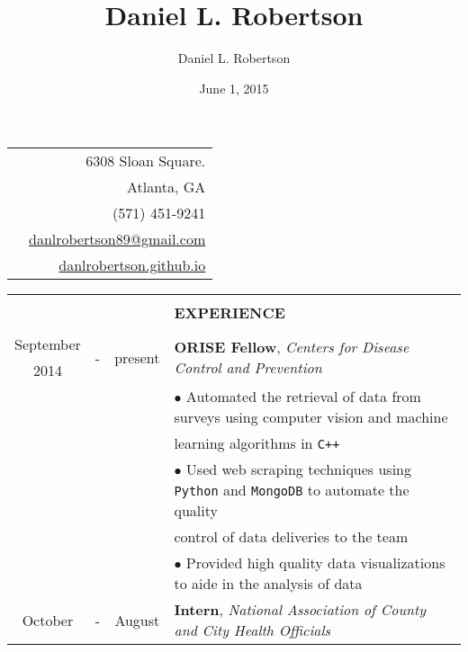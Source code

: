\documentclass[10pt]{article}
\title{Daniel L. Robertson}
\date{June 1, 2015}
\author{Daniel L. Robertson}
\begin{document}
    \normalfont
    \begin{table}[ht]
        \begin{tabular}{p{13cm}r}
            \multirow{5}{*}{\hspace*{1cm}\color{maroon}{\huge\textbf{Daniel L. Robertson}}} & 6308 Sloan Square.\\
            & Atlanta, GA\\
            & (571) 451-9241\\
            & \href{mailto:danlrobertson89@gmail.com}{danlrobertson89@gmail.com}\\
            & \href{http://danlrobertson.github.io}{danlrobertson.github.io}\\
        \end{tabular}
        \begin{tabular}{@{\hspace{0mm}}c@{\hspace{1mm}}c@{\hspace{3mm}}cl}
            & & & \color{maroon}{\rule{14cm}{0.75pt}}\\
            & & & \large{\textbf{EXPERIENCE}}\\
            & & & \color{maroon}{\rule{14cm}{0.75pt}}\\
            September & \multirow{2}{*}{-} & \multirow{2}{*}{present} & \multirow{2}{*}{\textbf{ORISE Fellow}, \textit{Centers for Disease Control and Prevention}}\\
            2014 & & &\\
            & & & $\bullet$ Automated the retrieval of data from surveys using computer vision and machine\\
            & & & \hspace*{4mm}learning algorithms in \texttt{C++}\\
            & & & $\bullet$ Used web scraping techniques using \texttt{Python} and \texttt{MongoDB} to automate the quality\\
            & & & \hspace*{4mm}control of data deliveries to the team\\
            & & & $\bullet$ Provided high quality data visualizations to aide in the analysis of data\\
            October & \multirow{2}{*}{-} & August & \multirow{2}{*}{\textbf{Intern}, \textit{National Association of County and City Health Officials}}\\

\end{tabular}
\end{table}
\end{document}

